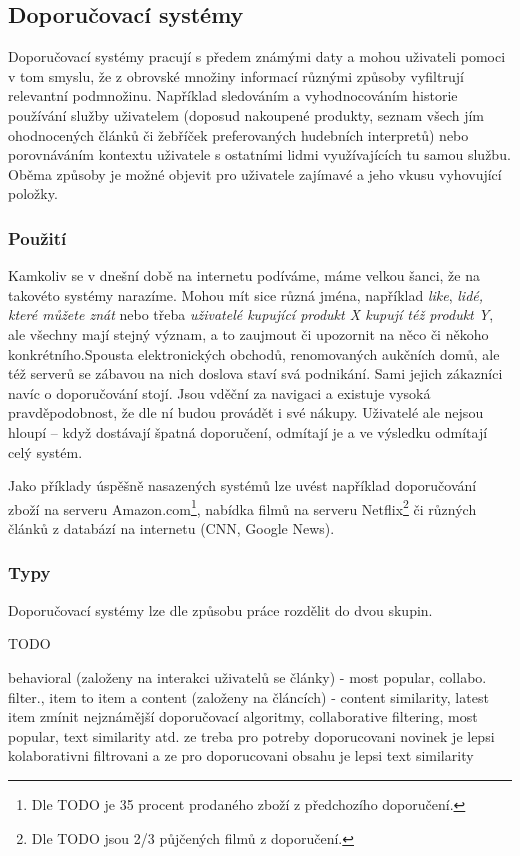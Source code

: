 \documentclass[thesis=M,czech]{FITthesis}[2014/05/07]
\begin{document}
\begin{introduction}
	\subsection{Doporučovací systémy}
 Doporučovací systémy pracují s předem známými daty a mohou uživateli pomoci v tom smyslu, že z obrovské množiny informací různými způsoby vyfiltrují relevantní podmnožinu. Například sledováním a vyhodnocováním historie používání služby uživatelem (doposud nakoupené produkty, seznam všech jím ohodnocených článků či žebříček preferovaných hudebních interpretů) nebo porovnáváním kontextu uživatele s ostatními lidmi využívajících tu samou službu. Oběma způsoby je možné objevit pro uživatele zajímavé a jeho vkusu vyhovující položky.
	
	\subsubsection{Použití}
Kamkoliv se v dnešní době na internetu podíváme, máme velkou šanci, že na takovéto systémy narazíme. Mohou mít sice různá jména, například \emph{like}, \emph{lidé, které můžete znát} nebo třeba \emph{uživatelé kupující produkt X kupují též produkt Y}, ale všechny mají stejný význam, a to zaujmout či upozornit na něco či někoho konkrétního.Spousta elektronických obchodů, renomovaných aukčních domů, ale též serverů se zábavou na nich doslova staví svá podnikání. 
Sami jejich zákazníci navíc o doporučování stojí. Jsou vděční za navigaci a existuje vysoká pravděpodobnost, že dle ní budou provádět i své nákupy. Uživatelé ale nejsou hloupí – když dostávají špatná doporučení, odmítají je a ve výsledku odmítají celý systém.

Jako příklady úspěšně nasazených systémů lze uvést například doporučování zboží na serveru Amazon.com\footnote{Dle TODO je 35 procent prodaného zboží z předchozího doporučení.}, nabídka filmů na serveru Netflix\footnote{Dle TODO jsou 2/3 půjčených filmů z doporučení.} či různých článků z databází na internetu (CNN, Google News). 
	
	\subsubsection{Typy}
Doporučovací systémy lze dle způsobu práce rozdělit do dvou skupin. 

TODO

	behavioral (založeny na interakci uživatelů se články) - most popular, collabo. filter., item to item a content (založeny na článcích) - content similarity, latest item
	zmínit nejznámější doporučovací algoritmy, collaborative filtering, most popular, text similarity atd.
	ze treba pro potreby doporucovani novinek je lepsi kolaborativni filtrovani a ze pro doporucovani obsahu je lepsi text similarity


\end{introduction}
\end{document}
